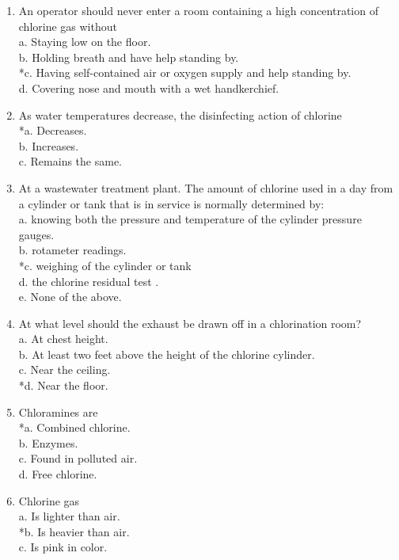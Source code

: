 \begin{enumerate}
\item An operator should never enter a room containing a high concentration of chlorine gas without \\
a. Staying low on the floor. \\
b. Holding breath and have help standing by. \\
*c. Having self-contained air or oxygen supply and help standing by. \\
d. Covering nose and mouth with a wet handkerchief. \\
\item As water temperatures decrease, the disinfecting action of chlorine \\
*a. Decreases. \\
b. Increases. \\
c. Remains the same. \\
\item At a wastewater treatment plant. The amount of chlorine used in a day from a cylinder or tank that is in service is normally determined by: \\
a. knowing both the pressure and temperature of the cylinder pressure gauges. \\
b. rotameter readings. \\
*c. weighing of the cylinder or tank \\
d. the chlorine residual test . \\
e. None of the above. \\
\item At what level should the exhaust be drawn off in a chlorination room? \\
a. At chest height. \\
b. At least two feet above the height of the chlorine cylinder. \\
c. Near the ceiling. \\
*d. Near the floor. \\
\item Chloramines are \\
*a. Combined chlorine. \\
b. Enzymes. \\
c. Found in polluted air. \\
d. Free chlorine. \\
\item Chlorine gas \\
a. Is lighter than air. \\
*b. Is heavier than air. \\
c. Is pink in color. \\

\end{enumerate}
